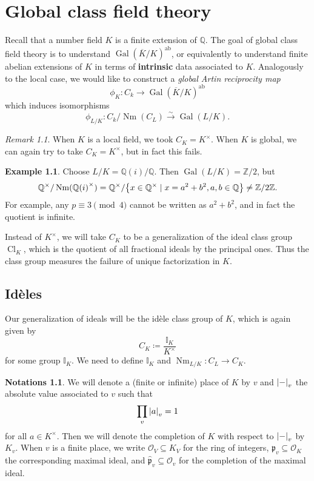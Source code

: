 \documentclass[leqno, openany]{memoir}
\theoremstyle{definition}
\newtheorem{exm}[thm]{Example}
\newtheorem{notns}[thm]{Notations}
\theoremstyle{remark}
\newtheorem{rmk}[thm]{Remark}
\theoremstyle{plain}
\theoremstyle{definition}
\theoremstyle{remark}
\newcommand{\Z}{\mathbb{Z}}
\newcommand{\Q}{\mathbb{Q}}
\newcommand{\I}{\mathbb{I}}
\newcommand{\mc}[1]{\mathcal{#1}}
\newcommand{\mf}[1]{\mathfrak{#1}}
\newcommand{\mr}[1]{\mathrm{#1}}
\newcommand{\ol}[1]{\overline{#1}}
\newcommand{\wh}[1]{\widehat{#1}}
\DeclareMathOperator{\Gal}{Gal}
\DeclareMathOperator{\Cl}{Cl}
\DeclareMathOperator{\Nm}{Nm}
\begin{document}
\chapter{Global class field theory}%
\label{cha:global_class_field_theory}

Recall that a number field $K$ is a finite extension of $\Q$. The goal of global class field theory is to understand ${ \Gal(\ol{K}/K) }^{\mr{ab}}$, or equivalently to understand finite abelian extensions of $K$ in terms of \textbf{intrinsic} data associated to $K$. Analogously to the local case, we would like to construct a \textit{global Artin reciprocity map}
\[ \phi_K \colon C_k \to {\Gal(\ol{K}/K)}^{\mr{ab}} \]
which induces isomorphisms
\[ \phi_{L/K} \colon C_k/\Nm(C_L) \xrightarrow{\sim} \Gal(L/K). \]

\begin{rmk}
    When $K$ is a local field, we took $C_K = K^{\times}$. When $K$ is global, we can again try to take $C_K = K^{\times}$, but in fact this fails.
\end{rmk}

\begin{exm}
    Choose $L/K = \Q(i)/\Q$. Then $\Gal(L/K) = \Z/2$, but 
    \[ \Q^{\times}/\Nm({\Q(i)}^{\times}) = \Q^{\times}/\qty{x \in \Q^{\times} \mid x = a^2+b^2, a,b \in \Q} \neq \Z/2\Z. \]
    For example, any $p \equiv 3 \pmod 4$ cannot be written as $a^2+b^2$, and in fact the quotient is infinite.
\end{exm}

Instead of $K^{\times}$, we will take $C_K$ to be a generalization of the ideal class group $\Cl_K$, which is the quotient of all fractional ideals by the principal ones. Thus the class group measures the failure of unique factorization in $K$.

\section{Id\`eles}%
\label{sec:id`eles}

Our generalization of ideals will be the id\`ele class group of $K$, which is again given by
\[ C_K \coloneqq \frac{\mathbb{I}_K}{K^{\times}} \]
for some group $\I_K$. We need to define $\I_K$ and $\Nm_{L/K} \colon C_L \to C_K$.

\begin{notns}
    We will denote a (finite or infinite) place of $K$ by $v$ and $\abs{-}_v$ the absolute value associated to $v$ such that
    \[ \prod_v \abs{a}_v = 1 \]
    for all $a \in K^{\times}$. Then we will denote the completion of $K$ with respect to $\abs{-}_v$ by $K_v$. When $v$ is a finite place, we write $\mc{O}_V \subseteq K_V$ for the ring of integers, $\mf{p}_v \subseteq \mc{O}_K$ the corresponding maximal ideal, and $\wh{\mf{p}}_v \subseteq \mc{O}_v$ for the completion of the maximal ideal.
\end{notns}
\end{document}
